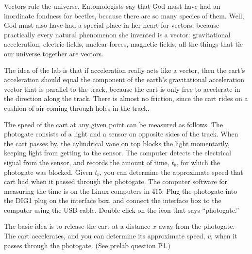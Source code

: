 \label{lab:acceltwod}

\apparatus
{}


\introduction

Vectors rule the universe.  Entomologists say that God must
have had an inordinate fondness for beetles, because there
are so many species of them.  Well, God must also have had a
special place in her heart for vectors, because practically
every natural phenomenon she invented is a vector:
gravitational acceleration, electric fields, nuclear forces,
magnetic fields, all the things that tie our universe
together are vectors.


\setup

The idea of the lab is that if acceleration really acts like
a vector, then the cart's acceleration should equal the
component of the earth's gravitational acceleration vector
that is parallel to the track, because the cart is only free
to accelerate in the direction along the track.  There is
almost no friction, since the cart rides on a cushion of air
coming through holes in the track.

The speed of the cart at any given point can be measured as
follows.  The photogate consists of a light and a sensor on
opposite sides of the track.  When the cart passes by, the
cylindrical vane on top blocks the light momentarily, keeping
light from getting to the sensor.  The computer detects the
electrical signal from the sensor, and records the amount of
time, $t_b$, for which the photogate was blocked.  Given
$t_b$, you can determine the approximate speed that cart had
when it passed through the photogate.  The computer software
for measuring the time is on the Linux computers in 415.
Plug the photogate into the DIG1 plug
on the interface box, and connect the interface box to the computer
using the USB cable.
Double-click on the icon that says ``photogate.''


\observations

The basic idea is to release the cart at a distance $x$ away
from the photogate.  The cart accelerates, and you can
determine its approximate speed, $v$, when it passes through
the photogate.  (See prelab question P1.)


